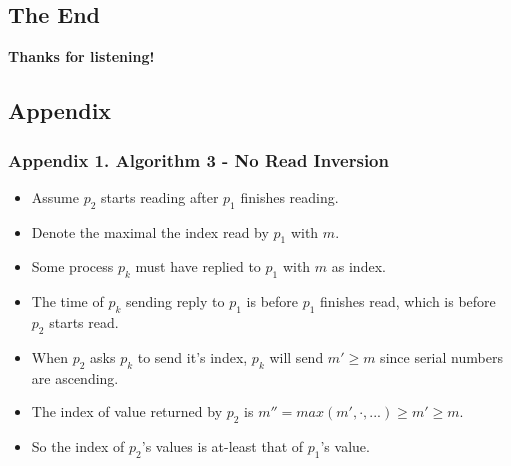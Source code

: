 \subsection{The End}
\begin{frame}
    \begin{center}
        \textbf{Thanks for listening!}
    \end{center}
\end{frame}

\subsection{Appendix}
\begin{frame}
    \frametitle{Appendix 1. Algorithm 3 - No Read Inversion}
    \begin{itemize}
        \item Assume $p_2$ starts reading after $p_1$ finishes reading.
        \item Denote the maximal the index read by $p_1$ with $m$.
        \item Some process $p_k$ must have replied to $p_1$ with $m$ as index.
        \item The time of $p_k$ sending reply to $p_1$ is before $p_1$ finishes read, which is before $p_2$ starts read.
        \item When $p_2$ asks $p_k$ to send it's index, $p_k$ will send $m'\geq m$ since serial numbers are ascending.
        \item The index of value returned by $p_2$ is $m''=max(m', \cdot, ...)\geq m'\geq m$.
        \item So the index of $p_2$'s values is at-least that of $p_1$'s value.
    \end{itemize}
\end{frame}